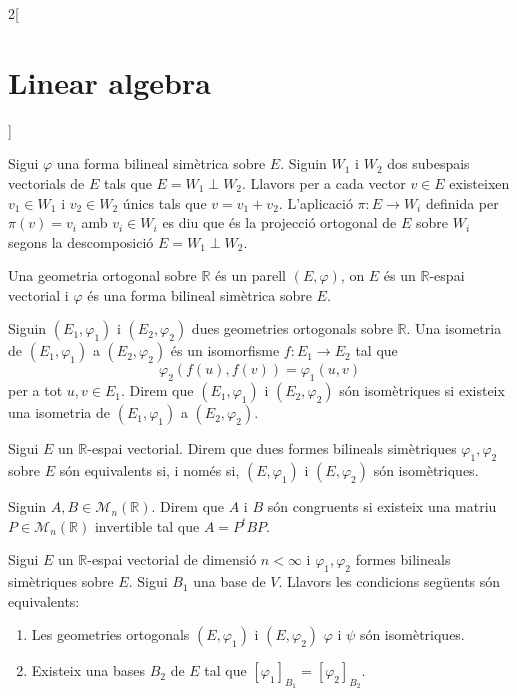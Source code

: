 \documentclass[class=article,10pt,crop=false]{standalone}
\begin{document}
\begin{multicols}{2}[\section{Linear algebra}]
\begin{definition}
\end{definition}
\begin{definition}
Sigui $\varphi$ una forma bilineal simètrica sobre $E$. Siguin $W_1$ i $W_2$ dos subespais vectorials de $E$ tals que $E=W_1\perp W_2$. Llavors per a cada vector $v\in E$ existeixen $v_1\in W_1$ i $v_2\in W_2$ únics tals que $v=v_1+v_2$. L'aplicació $\pi:E\rightarrow W_i$ definida per $\pi(v)=v_i$ amb $v_i\in W_i$ es diu que és la projecció ortogonal de $E$ sobre $W_i$ segons la descomposició $E=W_1\perp W_2$.
\label{perpendicular}
\end{definition}
\begin{definition}
Una geometria ortogonal sobre $\mathbb{R}$ és un parell $(E,\varphi)$, on $E$ és un $\mathbb{R}$-espai vectorial i $\varphi$ és una forma bilineal simètrica sobre $E$.
\end{definition}
\begin{definition}
Siguin $(E_1,\varphi_1)$ i $(E_2,\varphi_2)$ dues geometries ortogonals sobre $\mathbb{R}$. Una isometria de $(E_1,\varphi_1)$ a $(E_2,\varphi_2)$ és un isomorfisme $f:E_1\rightarrow E_2$ tal que $$\varphi_2(f(u),f(v))=\varphi_1(u,v)$$ per a tot $u,v\in E_1$. Direm que $(E_1,\varphi_1)$ i $(E_2,\varphi_2)$ són isomètriques si existeix una isometria de $(E_1,\varphi_1)$ a $(E_2,\varphi_2)$.
\label{isometry}
\end{definition}
\begin{definition}
Sigui $E$ un $\mathbb{R}$-espai vectorial. Direm que dues formes bilineals simètriques $\varphi_1,\varphi_2$ sobre $E$ són equivalents si, i només si, $(E,\varphi_1)$ i $(E,\varphi_2)$ són isomètriques.
\end{definition}
\begin{definition}
Siguin $A,B\in\mathcal{M}_n(\mathbb{R})$. Direm que $A$ i $B$ són congruents si existeix una matriu $P\in\mathcal{M}_n(\mathbb{R})$ invertible tal que $A=P^tBP$.
\end{definition}
\begin{prop}
Sigui $E$ un $\mathbb{R}$-espai vectorial de dimensió $n<\infty$ i $\varphi_1,\varphi_2$ formes bilineals simètriques sobre $E$. Sigui $B_1$ una base de $V$. Llavors les condicions següents són equivalents:
\begin{enumerate}
    \item Les geometries ortogonals $(E,\varphi_1)$ i $(E,\varphi_2)$ $\varphi$ i $\psi$ són isomètriques.
    \item Existeix una bases $B_2$ de $E$ tal que $[\varphi_1]_{B_1}=[\varphi_2]_{B_2}$.

\end{enumerate}
\end{prop}
\end{multicols}
\end{document}
